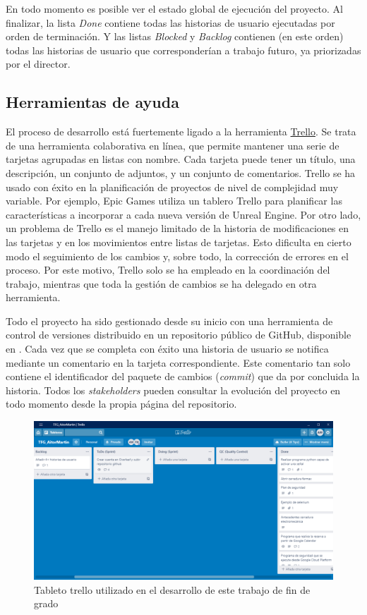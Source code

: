 En todo momento es posible ver el estado global de ejecución del proyecto.  Al finalizar, la lista \emph{Done} contiene todas las historias de usuario ejecutadas por orden de terminación.  Y las listas \emph{Blocked} y \emph{Backlog} contienen (en este orden) todas las historias de usuario que corresponderían a trabajo futuro, ya priorizadas por el director.

\subsection{Herramientas de ayuda}

El proceso de desarrollo está fuertemente ligado a la herramienta \href{https://trello.com/}{Trello}.  Se trata de una herramienta colaborativa en línea, que permite mantener una serie de tarjetas agrupadas en listas con nombre.  Cada tarjeta puede tener un título, una descripción, un conjunto de adjuntos, y un conjunto de comentarios.  Trello se ha usado con éxito en la planificación de proyectos de nivel de complejidad muy variable.  Por ejemplo, Epic Games utiliza un tablero Trello para planificar las características a incorporar a cada nueva versión de Unreal Engine.  Por otro lado, un problema de Trello es el manejo limitado de la historia de modificaciones en las tarjetas y en los movimientos entre listas de tarjetas.  Esto dificulta en cierto modo el seguimiento de los cambios y, sobre todo, la corrección de errores en el proceso.  Por este motivo, Trello solo se ha empleado en la coordinación del trabajo, mientras que toda la gestión de cambios se ha delegado en otra herramienta.

Todo el proyecto ha sido gestionado desde su inicio con una herramienta de control de versiones distribuido en un repositorio público de GitHub, disponible en \thegitrepo.  Cada vez que se completa con éxito una historia de usuario se notifica mediante un comentario en la tarjeta correspondiente.  Este comentario tan solo contiene el identificador del paquete de cambios (\emph{commit}) que da por concluida la historia.  Todos los \emph{stakeholders} pueden consultar la evolución del proyecto en todo momento desde la propia página del repositorio.

\begin{figure}[tbp]
\centering
\includegraphics[scale = 0.4]{fig/tableto-trello.PNG}
\caption{Tableto trello utilizado en el desarrollo de este trabajo de fin de grado}
\label{fig:tableto-de-trello}
\end{figure}